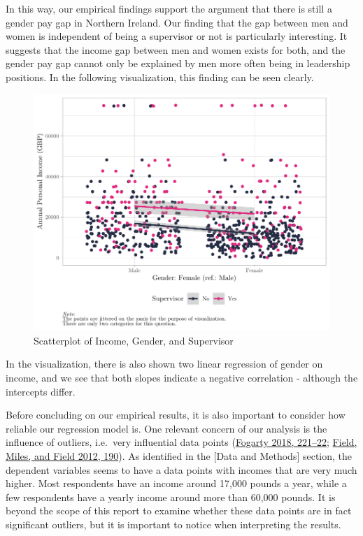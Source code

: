 \documentclass[
]{article}
\begin{document}
In this way, our empirical findings support the argument that there is
still a gender pay gap in Northern Ireland. Our finding that the gap
between men and women is independent of being a supervisor or not is
particularly interesting. It suggests that the income gap between men
and women exists for both, and the gender pay gap cannot only be
explained by men more often being in leadership positions. In the
following visualization, this finding can be seen clearly.

\begin{figure}[H]

{\centering \includegraphics[width=0.8\linewidth]{paper_files/figure-latex/unnamed-chunk-4-1} 

}

\caption{Scatterplot of Income, Gender, and Supervisor}\label{fig:unnamed-chunk-4}
\end{figure}

In the visualization, there is also shown two linear regression of
gender on income, and we see that both slopes indicate a negative
correlation - although the intercepts differ.

Before concluding on our empirical results, it is also important to
consider how reliable our regression model is. One relevant concern of
our analysis is the influence of outliers, i.e.~very influential data
points (\protect\hyperlink{ref-fogarty2018quantitative}{Fogarty 2018,
221--22}; \protect\hyperlink{ref-field2012discovering}{Field, Miles, and
Field 2012, 190}). As identified in the {[}Data and Methods{]} section,
the dependent variables seems to have a data points with incomes that
are very much higher. Most respondents have an income around 17,000
pounds a year, while a few respondents have a yearly income around more
than 60,000 pounds. It is beyond the scope of this report to examine
whether these data points are in fact significant outliers, but it is
important to notice when interpreting the results.
\end{document}

